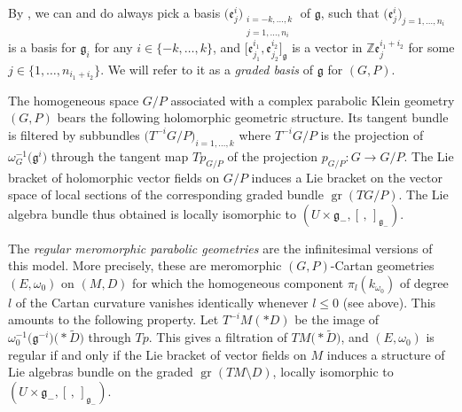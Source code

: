 \documentclass[10pt,a4paper]{amsart}
\numberwithin{equation}{section}
\begin{document}
 By \cite{Chevalley}, we can and do always pick a basis $\big(\mathfrak{e}^i_j\big)_{\substack{i=-k,\dots,k \\ j=1,\dots,n_i}}$ of $\mathfrak{g}$, such that $\big(\mathfrak{e}_j^i\big)_{j=1,\dots,n_i}$ is a basis for $\mathfrak{g}_i$ for any $i\in \{-k,\dots,k\}$, and $\big[\mathfrak{e}^{i_1}_{j_1},\mathfrak{e}^{i_2}_{j_2}\big]_\mathfrak{g}$ is a vector in $\mathbb{Z}\mathfrak{e}^{i_1+i_2}_{j}$ for some $j\in \{1,\dots,n_{i_1+i_2}\}$. We will refer to it as a \textit{graded basis} of $\mathfrak{g}$ for $(G,P)$.

 The homogeneous space $G/P$ associated with a complex parabolic Klein geometry $(G,P)$ bears the following holomorphic geometric structure. Its tangent bundle is filtered by subbundles $\big(T^{-i}G/P\big)_{i=1,\dots,k}$ where $T^{-i}G/P$ is the projection of $\omega_G^{-1}\big(\mathfrak{g}^i\big)$ through the tangent map $Tp_{G/P}$ of the projection $p_{G/P}\colon G \longrightarrow G/P$. The Lie bracket of holomorphic vector fields on $G/P$ induces a Lie bracket on the vector space of local sections of the corresponding graded bundle $\operatorname{gr}(TG/P)$. The Lie algebra bundle thus obtained is locally isomorphic to $(U\times \mathfrak{g}_-, [\,,\,]_{\mathfrak{g}_-})$.

 The \textit{regular meromorphic parabolic geometries} are the infinitesimal versions of this model. More precisely, these are meromorphic $(G,P)$-Cartan geometries $(E,\omega_0)$ on $(M,D)$ for which the homogeneous component $\pi_l(k_{\omega_0})$ of degree $l$ of the Cartan curvature vanishes identically whenever $l\leq 0$ (see above). This amounts to the following property. Let $T^{-i}M(* D)$ be the image of $\omega_0^{-1}\big(\mathfrak{g}^{-i}\big)\bigl(* \tilde{D}\bigr)$ through $Tp$. This gives a filtration of $TM\bigl(* \tilde{D}\bigr)$, and $(E,\omega_0)$ is regular if and only if the Lie bracket of vector fields on $M$ induces a structure of Lie algebras bundle on the graded $\operatorname{gr}(TM\setminus D)$, locally isomorphic to $(U\times \mathfrak{g}_-,[\,,\,]_{\mathfrak{g}_-})$.
\end{document}
